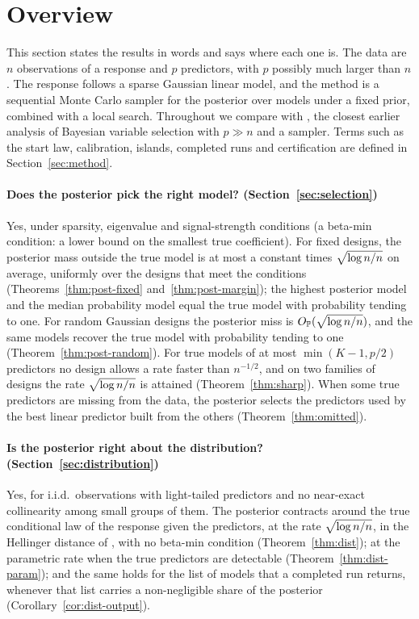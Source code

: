 \section{Overview}\label{sec:overview}

This section states the results in words and says where each one is. The data are $n$ observations of a response and $p$
predictors, with $p$ possibly much larger than $n$. The response follows a sparse Gaussian linear model, and the method
is a sequential Monte Carlo sampler for the posterior over models under a fixed prior, combined with a local search.
Throughout we compare with \citet{SongLiang2015}, the closest earlier analysis of Bayesian variable selection with
$p\gg n$ and a sampler. Terms such as the start law, calibration, islands, completed runs and certification are defined in
Section~\ref{sec:method}.

\paragraph{Does the posterior pick the right model? (Section~\ref{sec:selection})} Yes, under sparsity, eigenvalue and
signal-strength conditions (a beta-min condition: a lower bound on the smallest true coefficient). For fixed designs, the posterior mass outside the true model is at most a constant times
$\sqrt{\log n/n}$ on average, uniformly over the designs that meet the conditions (Theorems~\ref{thm:post-fixed}
and~\ref{thm:post-margin}); the highest posterior model and the median probability model equal the true model with
probability tending to one. For random Gaussian designs the posterior miss is $O_{\mathbb{P}}(\sqrt{\log n/n})$, and the same models recover
the true model with probability tending to one (Theorem~\ref{thm:post-random}). For true models of at most
$\min(K-1,p/2)$ predictors no design allows a rate faster than $n^{-1/2}$, and on two families of designs the rate $\sqrt{\log n/n}$ is attained (Theorem~\ref{thm:sharp}). When
some true predictors are missing from the data, the posterior selects the predictors used by the best linear predictor
built from the others (Theorem~\ref{thm:omitted}).

\paragraph{Is the posterior right about the distribution? (Section~\ref{sec:distribution})} Yes, for i.i.d.\ observations
with light-tailed predictors and no near-exact collinearity among small groups of them. The posterior contracts around
the true conditional law of the response given the predictors, at the rate $\sqrt{\log n/n}$, in the Hellinger distance of
\citet{SongLiang2015}, with no beta-min condition (Theorem~\ref{thm:dist}); at the parametric rate when the true
predictors are detectable (Theorem~\ref{thm:dist-param}); and the same holds for the list of models that a completed run
returns, whenever that list carries a non-negligible share of the posterior (Corollary~\ref{cor:dist-output}).

